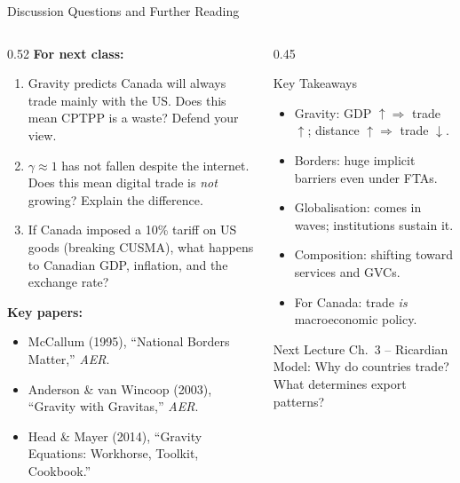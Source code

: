 \documentclass[aspectratio=169]{beamer}
\begin{document}
\begin{frame}[shrink=5]{Discussion Questions and Further Reading}
\begin{columns}[T]
\begin{column}{0.52\textwidth}
\textbf{For next class:}
\begin{enumerate}\small
  \item Gravity predicts Canada will always trade mainly with the US. Does this mean CPTPP is a waste? Defend your view.
  \item $\gamma\approx1$ has not fallen despite the internet. Does this mean digital trade is \emph{not} growing? Explain the difference.
  \item If Canada imposed a 10\% tariff on US goods (breaking CUSMA), what happens to Canadian GDP, inflation, and the exchange rate?
\end{enumerate}
\vspace{0.3em}
\textbf{Key papers:}
\begin{itemize}\footnotesize
  \item McCallum (1995), ``National Borders Matter,'' \textit{AER}.
  \item Anderson \& van Wincoop (2003), ``Gravity with Gravitas,'' \textit{AER}.
  \item Head \& Mayer (2014), ``Gravity Equations: Workhorse, Toolkit, Cookbook.''
\end{itemize}
\end{column}
\begin{column}{0.45\textwidth}
\begin{block}{Key Takeaways}
\begin{itemize}\footnotesize
  \item Gravity: GDP $\uparrow \Rightarrow$ trade $\uparrow$; distance $\uparrow \Rightarrow$ trade $\downarrow$.
  \item Borders: huge implicit barriers even under FTAs.
  \item Globalisation: comes in waves; institutions sustain it.
  \item Composition: shifting toward services and GVCs.
  \item For Canada: trade \emph{is} macroeconomic policy.
\end{itemize}
\end{block}
\vspace{0.3em}
\begin{block}{Next Lecture}
\footnotesize Ch.~3 -- Ricardian Model: Why do countries trade? What determines export patterns?
\end{block}
\end{column}
\end{columns}
\end{frame}
\end{document}

